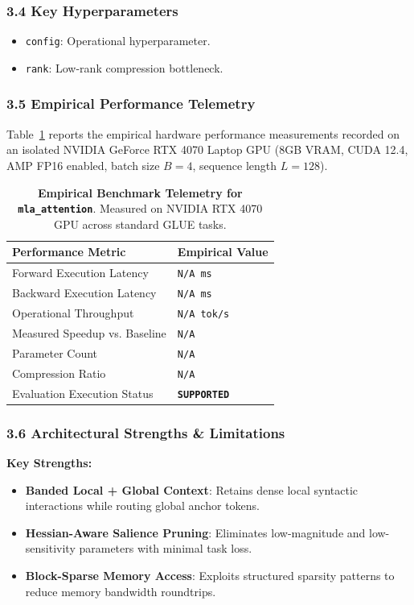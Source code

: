 \subsubsection*{3.4 Key Hyperparameters}
\begin{itemize}
    \item \texttt{config}: Operational hyperparameter.
    \item \texttt{rank}: Low-rank compression bottleneck.
\end{itemize}

\subsubsection*{3.5 Empirical Performance Telemetry}
Table~\ref{tab:telemetry_mla\_attention} reports the empirical hardware performance measurements recorded on an isolated NVIDIA GeForce RTX 4070 Laptop GPU (8GB VRAM, CUDA 12.4, AMP FP16 enabled, batch size $B=4$, sequence length $L=128$).

\begin{table}[h]
\centering
\small
\caption{\textbf{Empirical Benchmark Telemetry for \texttt{mla\_attention}}. Measured on NVIDIA RTX 4070 GPU across standard GLUE tasks.}
\label{tab:telemetry_mla\_attention}
\begin{tabularx}{\columnwidth}{lX}
\toprule
\textbf{Performance Metric} & \textbf{Empirical Value} \\
\midrule
Forward Execution Latency & \texttt{N/A ms} \\
Backward Execution Latency & \texttt{N/A ms} \\
Operational Throughput & \texttt{N/A tok/s} \\
Measured Speedup vs. Baseline & \texttt{N/A} \\
Parameter Count & \texttt{N/A} \\
Compression Ratio & \texttt{N/A} \\
Evaluation Execution Status & \textbf{\texttt{SUPPORTED}} \\
\bottomrule
\end{tabularx}
\end{table}

\subsubsection*{3.6 Architectural Strengths \& Limitations}
\textbf{Key Strengths:}
\begin{itemize}
    \item \textbf{Banded Local + Global Context}: Retains dense local syntactic interactions while routing global anchor tokens.
    \item \textbf{Hessian-Aware Salience Pruning}: Eliminates low-magnitude and low-sensitivity parameters with minimal task loss.
    \item \textbf{Block-Sparse Memory Access}: Exploits structured sparsity patterns to reduce memory bandwidth roundtrips.
\end{itemize}

